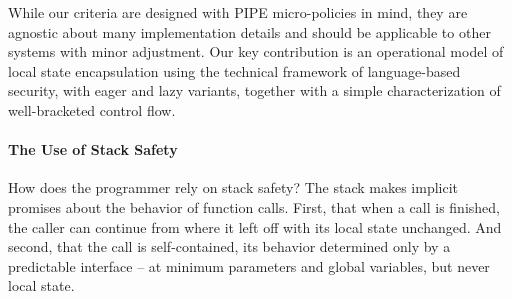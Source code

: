 \documentclass[acmsmall,review,anonymous]{acmart}\settopmatter{printfolios=true,printccs=false,printacmref=false}
\begin{document}
While our criteria are designed with PIPE micro-policies in mind, they are
agnostic about many implementation details and should be applicable to other
systems with minor adjustment.
%
Our key contribution is an operational model of local state encapsulation
using the technical framework of language-based security, with eager and lazy variants,
together with a simple characterization of well-bracketed control flow.


%

\paragraph*{The Use of Stack Safety}

How does the programmer rely on stack safety? The stack makes implicit promises about
the behavior of function calls. First, that when a call is finished, the caller can continue
from where it left off with its local state unchanged. And second, that the call is
self-contained, its behavior determined only by a predictable interface -- at minimum
parameters and global variables, but never local state.
\end{document}
